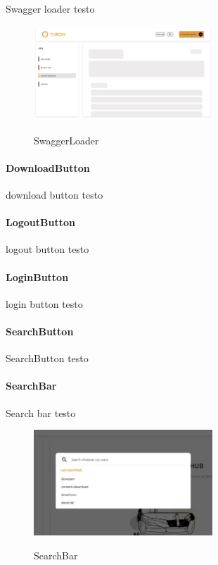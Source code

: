 Swagger loader testo
\begin{figure}[ht]
  \centering
  \includegraphics[width=0.6\textwidth, alt={Skeleton loader di caricamento per contenuto principale}]{images/frontend/SwaggerLoader.jpg}
  \caption{SwaggerLoader}\label{fig:swagger-loader}
\end{figure}

\paragraph{DownloadButton}\label{par:download-button}

download button testo

\paragraph{LogoutButton}\label{par:logout-button}

logout button testo

\paragraph{LoginButton}\label{par:login-button}

login button testo

\paragraph{SearchButton}\label{par:search-button}

SearchButton testo

\paragraph{SearchBar}\label{par:search-bar}

Search bar testo

\begin{figure}[ht]
  \centering
  \includegraphics[width=0.6\textwidth, alt={Barra di ricerca globale dell'applicazione}]{images/frontend/SearchBar.jpg}
  \caption{SearchBar}\label{fig:search-bar}
\end{figure}

